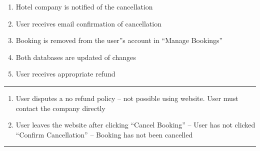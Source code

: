 \begin{enumerate}
	\item Hotel company is notified of the cancellation
	\item User receives email confirmation of cancellation
	\item Booking is removed from the user''s account in ``Manage Bookings''
	\item Both databases are updated of changes
	\item User receives appropriate refund
\end{enumerate}
\noindent\rule{\textwidth}{0.6pt}

\begin{enumerate}
	\item User disputes a no refund policy – not possible using website. User
		must contact the company directly
	\item User leaves the website after clicking ``Cancel Booking'' – User has
		not clicked ``Confirm Cancellation'' – Booking has not been cancelled
\end{enumerate}
\noindent\rule{\textwidth}{0.6pt}

\restoregeometry
